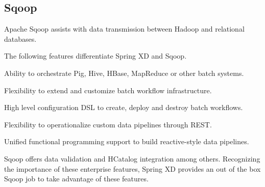 \subsection{Sqoop}
Apache Sqoop\cite{sqoop} assists with data transmission between Hadoop and relational
databases.

The following features differentiate Spring XD and Sqoop.

\begin{itemize*}
\item Ability to orchestrate Pig, Hive, HBase, MapReduce or other batch systems.
\item Flexibility to extend and customize batch workflow infrastructure.
\item High level configuration DSL to create, deploy and destroy batch workflows.
\item Flexibility to operationalize custom data pipelines through REST.
\item Unified functional programming support to build reactive-style data pipelines.
\end{itemize*}

Sqoop offers data validation and HCatalog integration among others. Recognizing the
importance of these enterprise features, Spring XD provides an out of the box Sqoop
job to take advantage of these features.
